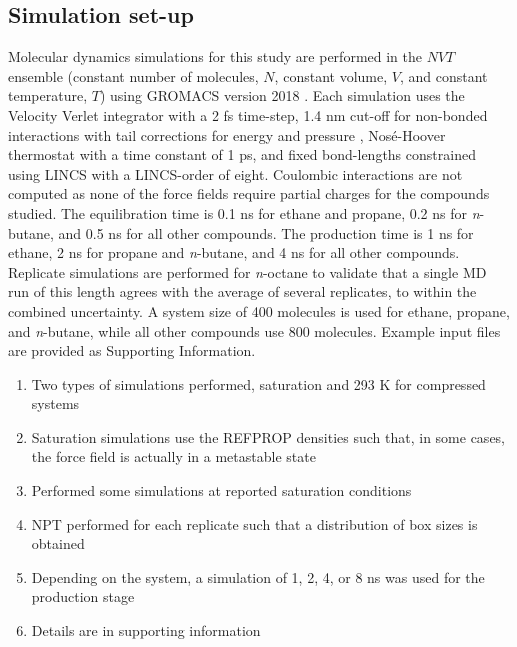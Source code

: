 \documentclass[preprint,review,12pt]{elsarticle}
\begin{document}
%
%

\subsection{Simulation set-up}

Molecular dynamics simulations for this study are performed in the $NVT$ ensemble (constant number of molecules, $N$, constant volume, $V$, and constant temperature, $T$) using GROMACS version 2018 \cite{GROMACS_2018}. Each simulation uses the Velocity Verlet integrator with a 2 fs time-step, 1.4 nm cut-off for non-bonded interactions with tail corrections for energy and pressure \cite{GROMACS_note}, Nos{\'e}-Hoover thermostat with a time constant of 1 ps, and fixed bond-lengths constrained using LINCS with a LINCS-order of eight. Coulombic interactions are not computed as none of the force fields require partial charges for the compounds studied. The equilibration time is 0.1 ns for ethane and propane, 0.2 ns for \textit{n}-butane, and 0.5 ns for all other compounds. The production time is 1 ns for ethane, 2 ns for propane and \textit{n}-butane, and 4 ns for all other compounds. Replicate simulations are performed for \textit{n}-octane to validate that a single MD run of this length agrees with the average of several replicates, to within the combined uncertainty. A system size of 400 molecules is used for ethane, propane, and \textit{n}-butane, while all other compounds use 800 molecules. Example input files are provided as Supporting Information.

\begin{enumerate}
	\item Two types of simulations performed, saturation and 293 K for compressed systems
	\item Saturation simulations use the REFPROP densities such that, in some cases, the force field is actually in a metastable state
	\item Performed some simulations at reported saturation conditions
	\item NPT performed for each replicate such that a distribution of box sizes is obtained
	\item Depending on the system, a simulation of 1, 2, 4, or 8 ns was used for the production stage
	\item Details are in supporting information
\end{enumerate}
\end{document}
